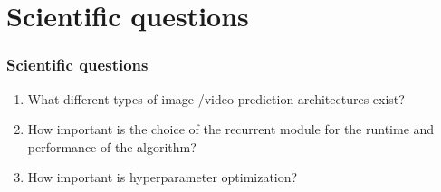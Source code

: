 \section{Scientific questions}
 \begin{frame}
  \frametitle{Scientific questions}
  
  \begin{enumerate}
   \item<1-> What different types of image-/video-prediction architectures exist?
   \item<2-> How important is the choice of the recurrent module for the runtime and performance of the algorithm?
   \item<3-> How important is hyperparameter optimization?
  \end{enumerate}
 \end{frame}  
